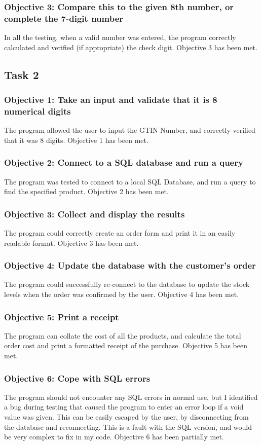 \documentclass[a4paper]{article}
\begin{document}
\subsubsection{Objective 3: Compare this to the given 8th number, or complete the 7-digit number}
In all the testing, when a valid number was entered, the program correctly calculated and verified (if appropriate) the check digit. Objective 3 has been met.
\subsection{Task 2}
\subsubsection{Objective 1: Take an input and validate that it is 8 numerical digits}
The program allowed the user to input the GTIN Number, and correctly verified that it was 8 digits. Objective 1 has been met.
\subsubsection{Objective 2: Connect to a SQL database and run a query}
The program was tested to connect to a local SQL Database, and run a query to find the specified product. Objective 2 has been met.
\subsubsection{Objective 3: Collect and display the results}
The program could correctly create an order form and print it in an easily readable format. Objective 3 has been met.
\subsubsection{Objective 4: Update the database with the customer's order}
The program could successfully re-connect to the database to update the stock levels when the order was confirmed by the user. Objective 4 has been met.
\subsubsection{Objective 5: Print a receipt}
The program can collate the cost of all the products, and calculate the total order cost and print a formatted receipt of the purchase. Objective 5 has been met.
\subsubsection{Objective 6: Cope with SQL errors}
The program should not encounter any SQL errors in normal use, but I identified a bug during testing that caused the program to enter an error loop if a void value was given. This can be easily escaped by the user, by disconnecting from the database and reconnecting. This is a fault with the SQL version, and would be very complex to fix in my code. Objective 6 has been partially met.
\end{document}
